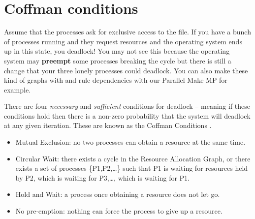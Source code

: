 \section{Coffman conditions}

Assume that the processes ask for exclusive access to the file.
If you have a bunch of processes running and they request resources and the operating system ends up in this state, you deadlock!
You may not see this because the operating system may \textbf{preempt} some processes breaking the cycle but there is still a change that your three lonely processes could deadlock.
You can also make these kind of graphs with  and rule dependencies with our Parallel Make MP for example.

There are four \emph{necessary} and \emph{sufficient} conditions for deadlock -- meaning if these conditions hold then there is a non-zero probability that the system will deadlock at any given iteration.
These are known as the \gls{Coffman Conditions} \cite{coffman1971system}.

\begin{itemize}
\tightlist
\item
  \gls{Mutual Exclusion}: no two processes can obtain a resource at the same time.
\item
  \gls{Circular Wait}: there exists a cycle in the Resource Allocation Graph, or there exists a set of processes \{P1,P2,\ldots{}\} such that P1 is waiting for resources held by P2, which is waiting for P3,\ldots{}, which is waiting for P1.
\item
  \gls{Hold and Wait}: a process once obtaining a resource does not let go.
\item
  No \gls{pre-emption}: nothing can force the process to give up a resource.
\end{itemize}

